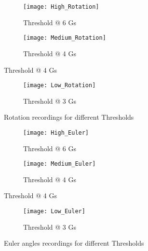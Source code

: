 \begin{figure}[hbt!]
	\centering
	\begin{subfigure}{0.9\linewidth}
		\centering
		\texttt{[image: High\_Rotation]}
		\caption{Threshold @ 6 Gs}
		\label{fig:high_rot}
	\end{subfigure}
	\begin{subfigure}{0.9\linewidth}
		\centering
		\texttt{[image: Medium\_Rotation]}
		\caption{Threshold @ 4 Gs}
	\end{subfigure}
\end{figure}

\begin{figure}[hbt!]\ContinuedFloat
	\centering
	\begin{subfigure}{0.9\linewidth}
		\centering
		\texttt{[image: Low\_Rotation]}
		\caption{Threshold @ 3 Gs}
		\label{fig:low_rot}
	\end{subfigure}
	\caption{Rotation recordings for different Thresholds}
	\label{fig:impact_gyro}
\end{figure}


\begin{figure}[hbt!]
	\centering
	\begin{subfigure}{0.9\linewidth}
		\centering
		\texttt{[image: High\_Euler]}
		\caption{Threshold @ 6 Gs}
		\label{fig:high_euler}
	\end{subfigure}
	\begin{subfigure}{0.9\linewidth}
		\centering
		\texttt{[image: Medium\_Euler]}
		\caption{Threshold @ 4 Gs}
		\label{fig:medium_euler}
	\end{subfigure}
\end{figure}

\begin{figure}[hbt!]\ContinuedFloat
	\centering
	\begin{subfigure}{0.9\linewidth}
		\centering
		\texttt{[image: Low\_Euler]}
		\caption{Threshold @ 3 Gs}
		\label{fig:low_euler}
	\end{subfigure}
	\caption{Euler angles recordings for different Thresholds}
	\label{fig:impact_euler}
\end{figure}


